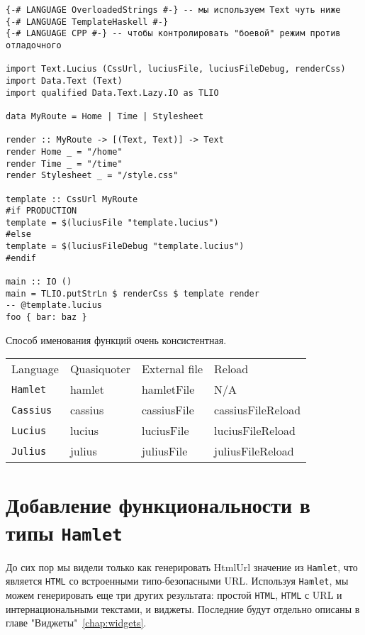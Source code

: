 \begin{lstlisting}[caption=Внешние файлы]
{-# LANGUAGE OverloadedStrings #-} -- мы используем Text чуть ниже
{-# LANGUAGE TemplateHaskell #-}
{-# LANGUAGE CPP #-} -- чтобы контролировать "боевой" режим против отладочного

import Text.Lucius (CssUrl, luciusFile, luciusFileDebug, renderCss)
import Data.Text (Text)
import qualified Data.Text.Lazy.IO as TLIO

data MyRoute = Home | Time | Stylesheet

render :: MyRoute -> [(Text, Text)] -> Text
render Home _ = "/home"
render Time _ = "/time"
render Stylesheet _ = "/style.css"

template :: CssUrl MyRoute
#if PRODUCTION
template = $(luciusFile "template.lucius")
#else
template = $(luciusFileDebug "template.lucius")
#endif

main :: IO ()
main = TLIO.putStrLn $ renderCss $ template render
-- @template.lucius
foo { bar: baz }
\end{lstlisting}

Способ именования функций очень консистентная.
\begin{tabular}{l l l l}
Language & Quasiquoter & External file & Reload \\
\texttt{Hamlet}   & hamlet      & hamletFile    & N/A    \\
\texttt{Cassius}  & cassius     & cassiusFile   & cassiusFileReload \\
\texttt{Lucius}   & lucius      & luciusFile    & luciusFileReload \\
\texttt{Julius}   & julius      & juliusFile    & juliusFileReload \\
\end{tabular}

\section{Добавление функциональности в типы \texttt{Hamlet}}
До сих пор мы видели только как генерировать HtmlUrl значение из \texttt{Hamlet}, что
является \texttt{HTML} со встроенными типо-безопасными URL. Используя \texttt{Hamlet},
мы можем генерировать еще три других результата: простой \texttt{HTML}, \texttt{HTML} с URL и
интернациональными текстами, и виджеты.
Последние будут отдельно описаны в главе "Виджеты"~\ref{chap:widgets}.

